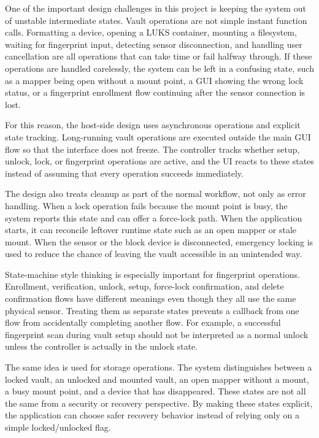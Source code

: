 One of the important design challenges in this project is keeping the system out of unstable intermediate states. Vault operations are not simple instant function calls. Formatting a device, opening a LUKS container, mounting a filesystem, waiting for fingerprint input, detecting sensor disconnection, and handling user cancellation are all operations that can take time or fail halfway through. If these operations are handled carelessly, the system can be left in a confusing state, such as a mapper being open without a mount point, a GUI showing the wrong lock status, or a fingerprint enrollment flow continuing after the sensor connection is lost.

For this reason, the host-side design uses asynchronous operations and explicit state tracking. Long-running vault operations are executed outside the main GUI flow so that the interface does not freeze. The controller tracks whether setup, unlock, lock, or fingerprint operations are active, and the UI reacts to these states instead of assuming that every operation succeeds immediately.

The design also treats cleanup as part of the normal workflow, not only as error handling. When a lock operation fails because the mount point is busy, the system reports this state and can offer a force-lock path. When the application starts, it can reconcile leftover runtime state such as an open mapper or stale mount. When the sensor or the block device is disconnected, emergency locking is used to reduce the chance of leaving the vault accessible in an unintended way.

State-machine style thinking is especially important for fingerprint operations. Enrollment, verification, unlock, setup, force-lock confirmation, and delete confirmation flows have different meanings even though they all use the same physical sensor. Treating them as separate states prevents a callback from one flow from accidentally completing another flow. For example, a successful fingerprint scan during vault setup should not be interpreted as a normal unlock unless the controller is actually in the unlock state.

The same idea is used for storage operations. The system distinguishes between a locked vault, an unlocked and mounted vault, an open mapper without a mount, a busy mount point, and a device that has disappeared. These states are not all the same from a security or recovery perspective. By making these states explicit, the application can choose safer recovery behavior instead of relying only on a simple locked/unlocked flag.

